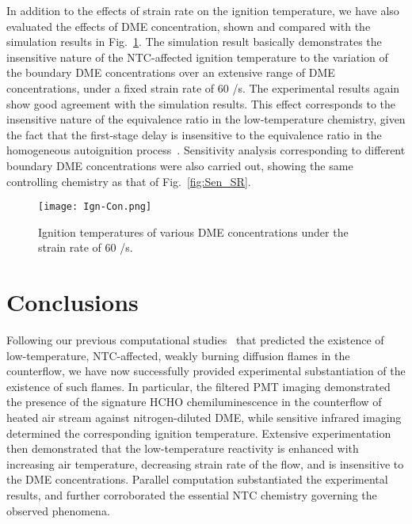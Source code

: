 \documentclass[review,3p,times]{elsarticleUS}
\begin{document}
In addition to the effects of strain rate on the ignition temperature, we have also evaluated the effects of DME concentration, shown and compared with the simulation results in Fig.~\ref{fig:Ign-Con}.  The simulation result basically demonstrates the insensitive nature of the NTC-affected ignition temperature to the variation of the boundary DME concentrations over an extensive range of DME concentrations, under a fixed strain rate of $60$ /s.  The experimental results again show good agreement with the simulation results.  This effect corresponds to the insensitive nature of the equivalence ratio in the low-temperature chemistry, given the fact that the first-stage delay is insensitive to the equivalence ratio in the homogeneous autoignition process~\cite{zhao13}.  Sensitivity analysis corresponding to different boundary DME concentrations were also carried out, showing the same controlling chemistry as that of Fig.~\ref{fig:Sen_SR}.

\begin{figure}[t]
  \centering
  \scriptsize
  \vspace{-0.1in}
  \texttt{[image: Ign-Con.png]}
  \normalsize
  \vspace{-0.1in}
  \caption{Ignition temperatures of various DME concentrations under the strain rate of $60$ /s.}
  \label{fig:Ign-Con}
\end{figure}


\section{Conclusions}        

Following our previous computational studies~\cite{law12,zhao13} that predicted the existence of low-temperature, NTC-affected, weakly burning diffusion flames in the counterflow, we have now successfully provided experimental substantiation of the existence of such flames.  In particular, the filtered PMT imaging demonstrated the presence of the signature HCHO chemiluminescence in the counterflow of heated air stream against nitrogen-diluted DME, while sensitive infrared imaging determined the corresponding ignition temperature.  Extensive experimentation then demonstrated that the low-temperature reactivity is enhanced with increasing air temperature, decreasing strain rate of the flow, and is insensitive to the DME concentrations.  Parallel computation substantiated the experimental results, and further corroborated the essential NTC chemistry governing the observed phenomena.
\end{document}

